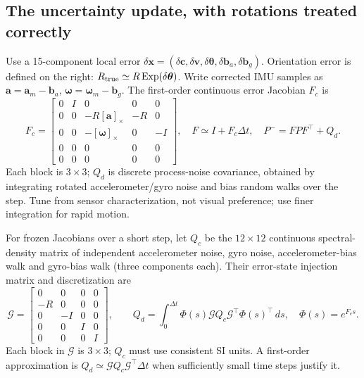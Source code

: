 \documentclass[11pt,a4paper]{article}
\newcommand{\sk}[1]{[#1]_\times}
\DeclareMathOperator{\Exp}{Exp}
\begin{document}
\subsection{The uncertainty update, with rotations treated correctly}
Use a 15-component local error
$\delta\bm{x}=(\delta\bm{c},\delta\bm{v},\delta\bm{\theta},
\delta\bm{b}_a,\delta\bm{b}_g)$.
Orientation error is defined on the right:
$R_{\rm true}\simeq R\Exp(\delta\bm{\theta})$.
Write corrected IMU samples as
$\bm{a}=\bm{a}_m-\bm{b}_a$, $\bm{\omega}=\bm{\omega}_m-\bm{b}_g$.
The first-order continuous error Jacobian $F_c$ is
\begin{equation}
F_c=\begin{bmatrix}
0&I&0&0&0\\
0&0&-R\sk{\bm{a}}&-R&0\\
0&0&-\sk{\bm{\omega}}&0&-I\\
0&0&0&0&0\\
0&0&0&0&0
\end{bmatrix},\quad
F\simeq I+F_c\Delta t,\quad
P^-=FPF^\top+Q_d.
\end{equation}
Each block is $3\times3$; $Q_d$ is discrete process-noise covariance,
obtained by integrating rotated accelerometer/gyro noise and bias random
walks over the step. Tune from sensor characterization, not visual
preference; use finer integration for rapid motion.

For frozen Jacobians over a short step, let $Q_c$ be the $12\times12$
continuous spectral-density matrix of independent accelerometer noise,
gyro noise, accelerometer-bias walk and gyro-bias walk (three components
each). Their error-state injection matrix and discretization are
\begin{equation}
\mathcal G=\begin{bmatrix}
0&0&0&0\\-R&0&0&0\\0&-I&0&0\\0&0&I&0\\0&0&0&I
\end{bmatrix},\qquad
Q_d=\int_0^{\Delta t}\Phi(s)\mathcal G Q_c\mathcal G^\top\Phi(s)^\top\,ds,
\quad \Phi(s)=e^{F_cs}.
\end{equation}
Each block in $\mathcal G$ is $3\times3$; $Q_c$ must use consistent SI
units. A first-order approximation is
$Q_d\simeq\mathcal G Q_c\mathcal G^\top\Delta t$ when sufficiently small
time steps justify it.
\end{document}
